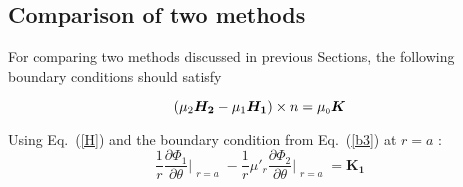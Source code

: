 \subsection{Comparison of two methods}
For comparing two methods discussed in previous Sections, the following boundary conditions should satisfy

\begin{equation}\label{b3}   
(\mu_2\bm{H_2} - \mu_1\bm{H_1})\times n = \mu_{\scriptscriptstyle 0} \bm{K}  
\end{equation}

Using Eq.~(\ref{H}) and the boundary condition from Eq.~(\ref{b3}) at $r=a$ :
$$\frac{1}{r}\frac{\partial \Phi_1}{\partial \theta}\Bigr|_{\substack{r=a}}-\frac{1}{r}\mu'_r\frac{\partial \Phi_2}{\partial \theta}\Bigr|_{\substack{r=a}}=\bm{K_1}  $$

